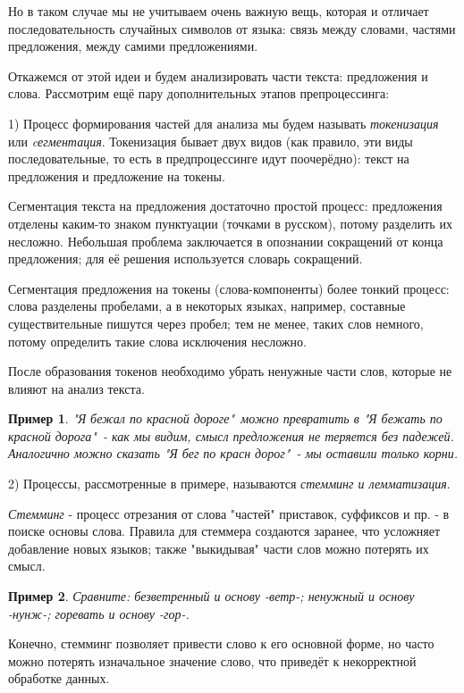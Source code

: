 \documentclass[12pt]{extarticle}
\newtheorem*{example}{Пример}
\begin{document}
	Но в таком случае мы не учитываем очень важную вещь, которая и отличает последовательность случайных символов от языка: связь между словами, частями предложения, между самими предложениями. 
	
	Откажемся от этой идеи и будем анализировать части текста: предложения и слова. Рассмотрим ещё пару дополнительных этапов препроцессинга:

	1) Процесс формирования частей для анализа мы будем называть \textit{токенизация} или \textit{cегментация}. Токенизация бывает двух видов (как правило, эти виды последовательные, то есть в предпроцессинге идут поочерёдно): текст на предложения и предложение на токены. 
	
	Сегментация текста на предложения достаточно простой процесс: предложения отделены каким-то знаком пунктуации (точками в русском), потому разделить их несложно. Небольшая проблема заключается в опознании сокращений от конца предложения; для её решения используется словарь сокращений. 
	
	Сегментация предложения на токены (слова-компоненты) более тонкий процесс: слова разделены пробелами, а в некоторых языках, например, составные существительные пишутся через пробел; тем не менее, таких слов немного, потому определить такие слова исключения несложно. 
	
	 
	После образования токенов необходимо убрать ненужные части слов, которые не влияют на анализ текста. 
	
	\begin{example}
	"Я бежал по красной дороге"\ можно превратить в "Я бежать по красной дорога"\ - как мы видим, смысл предложения не теряется без падежей. Аналогично можно сказать "Я бег по красн дорог"\ - мы оставили только корни.
	\end{example} 
	
	2) Процессы, рассмотренные в примере, называются \textit{стемминг и лемматизация}.
	 	
	\textit{Стемминг} - процесс отрезания от слова "частей"\: приставок, суффиксов и пр. - в поиске основы слова. Правила для стеммера создаются заранее, что усложняет добавление новых языков; также "выкидывая" части слов можно потерять их смысл.
	
	\begin{example}
		Сравните: безветренный и основу -ветр-; ненужный и основу -нунж-; горевать и основу -гор-. 
	\end{example} 
	
	Конечно, стемминг позволяет привести слово к его основной форме, но часто можно потерять изначальное значение слово, что приведёт к некорректной обработке данных. 
	
\end{document}
